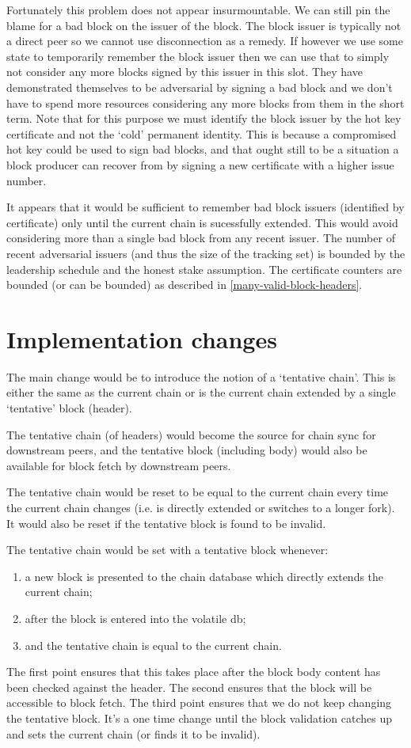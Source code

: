 \documentclass[11pt,a4paper]{article}
\begin{document}
Fortunately this problem does not appear insurmountable. We can still pin the
blame for a bad block on the issuer of the block. The block issuer is typically
not a direct peer so we cannot use disconnection as a remedy. If however we
use some state to temporarily remember the block issuer then we can use that to
simply not consider any more blocks signed by this issuer in this slot. They
have demonstrated themselves to be adversarial by signing a bad block and we
don't have to spend more resources considering any more blocks from them in
the short term. Note that for this purpose we must identify the block issuer
by the hot key certificate and not the `cold' permanent identity. This is
because a compromised hot key could be used to sign bad blocks, and that ought
still to be a situation a block producer can recover from by signing a new
certificate with a higher issue number.

It appears that it would be sufficient to remember bad block issuers
(identified by certificate) only until the current chain is sucessfully
extended. This would avoid considering more than a single bad block from any
recent issuer. The number of recent adversarial issuers (and thus the size of
the tracking set) is bounded by the leadership schedule and the honest stake
assumption. The certificate counters are bounded (or can be bounded) as
described in \cref{many-valid-block-headers}.

\section{Implementation changes}

The main change would be to introduce the notion of a `tentative chain'. This
is either the same as the current chain or is the current chain extended by a
single `tentative' block (header).

The tentative chain (of headers) would become the source for chain sync for
downstream peers, and the tentative block (including body) would also be
available for block fetch by downstream peers.

The tentative chain would be reset to be equal to the current chain every time
the current chain changes (i.e. is directly extended or switches to a longer
fork). It would also be reset if the tentative block is found to be invalid.

The tentative chain would be set with a tentative block whenever:
\begin{enumerate}
\item a new block is presented to the chain database which directly extends
      the current chain;
\item after the block is entered into the volatile db;
\item and the tentative chain is equal to the current chain.
\end{enumerate}
The first point ensures that this takes place after the block body content has
been checked against the header. The second ensures that the block will be
accessible to block fetch. The third point ensures that we do not keep changing
the tentative block. It's a one time change until the block validation catches
up and sets the current chain (or finds it to be invalid).
\end{document}
